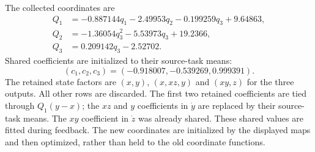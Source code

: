 \endgroup
\noindent The collected coordinates are
\begin{align*}
Q_1&=- 0.887144 q_{1} - 2.49953 q_{2} - 0.199259 q_{3} + 9.64863,\\
Q_2&=- 1.36054 q_{3}^{2} - 5.53973 q_{3} + 19.2366,\\
Q_3&=0.209142 q_{3} - 2.52702.
\end{align*}
\noindent Shared coefficients are initialized to their source-task means:
\[
(c_1,c_2,c_3)=(-0.918007,-0.539269,0.999391).
\]
The retained state factors are $(x,y)$, $(x,xz,y)$ and $(xy,z)$ for the three outputs. All other rows are discarded. The first two retained coefficients are tied through $Q_1(y-x)$; the $xz$ and $y$ coefficients in $\dot y$ are replaced by their source-task means. The $xy$ coefficient in $\dot z$ was already shared.
These shared values are fitted during feedback. The new coordinates are initialized by the displayed maps and then optimized, rather than held to the old coordinate functions.
